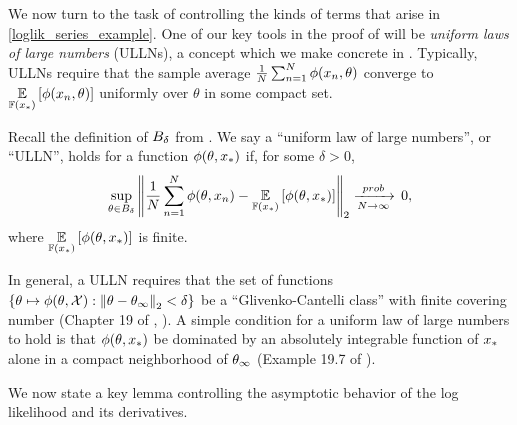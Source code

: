 We now turn to the task of controlling the kinds of terms that arise in
\eqref{loglik_series_example}. One of our key tools in the proof of
 will be \emph{uniform laws of large numbers} (ULLNs), a concept
which we make concrete in . Typically, ULLNs require that the
sample average $\frac{1}{N}\sum_{n=1}^N \phi(x_n, \theta)$ converge to
$\underset{\mathbb{F}(x_{*})}{\mathbb{E}}\left[\phi(x_n, \theta)\right]$ uniformly over $\theta$ in some
compact set.
%
\begin{defn}
%
Recall the definition of $B_{\delta}$ from . We say a
``uniform law of large numbers'', or ``ULLN'', holds for a function
$\phi(\theta, x_{*})$ if, for some $\delta > 0$,
%
\begin{align*}
%
\sup_{\theta \in \thetaball{\delta}}
\norm{\meann \phi(\theta, \x_n) -
\expect{\fdist(\xn)}{\phi(\theta, \xn)}}_2
\plim 0,
%
\end{align*}
%
where $\underset{\mathbb{F}(x_{*})}{\mathbb{E}}\left[\phi(\theta, x_{*})\right]$ is finite.
%
\end{defn}

In general, a ULLN requires that the set of functions $\left\{\theta \mapsto
\phi(\theta, {\mathcal{X}}): \left\Vert \theta - \theta_{\infty}\right\Vert_2 < \delta \right\}$ be a
``Glivenko-Cantelli class'' with finite covering number (Chapter 19 of
\citet{van:2000:asymptotic}, \citet{vaart:2013:empiricalprocesses}). A simple
condition for a uniform law of large numbers to hold is that $\phi(\theta, x_{*})$
be dominated by an absolutely integrable function of $x_{*}$ alone in a compact
neighborhood of $\theta_{\infty}$ (Example 19.7 of \citet{van:2000:asymptotic}).

We now state a key lemma controlling the asymptotic behavior of the log
likelihood and its derivatives.


